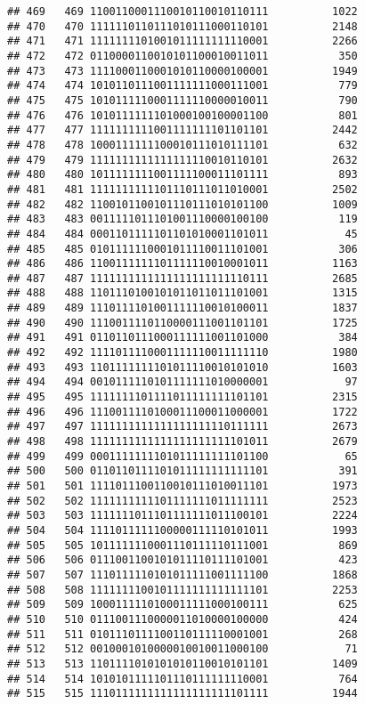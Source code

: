 \documentclass[]{article}
\begin{document}
\begin{verbatim}
## 469   469 1100110001110010110010110111          1022
## 470   470 1111110110111010111000110101          2148
## 471   471 1111111101001011111111110001          2266
## 472   472 0110000110010101100010011011           350
## 473   473 1111000110001010110000100001          1949
## 474   474 1010110111001111111000111001           779
## 475   475 1010111110001111110000010011           790
## 476   476 1010111111101000100100001100           801
## 477   477 1111111111001111111101101101          2442
## 478   478 1000111111100010111010111101           632
## 479   479 1111111111111111110010110101          2632
## 480   480 1011111111001111100011101111           893
## 481   481 1111111111101110111011010001          2502
## 482   482 1100101100101110111010101100          1009
## 483   483 0011111011101001110000100100           119
## 484   484 0001101111101101010001101011            45
## 485   485 0101111110001011110011101001           306
## 486   486 1100111111101111110010001011          1163
## 487   487 1111111111111111111111110111          2685
## 488   488 1101110100101011011011101001          1315
## 489   489 1110111101001111110010100011          1837
## 490   490 1110011110110000111001101101          1725
## 491   491 0110110111000111111001101000           384
## 492   492 1111011110001111110011111110          1980
## 493   493 1101111111101011110010101010          1603
## 494   494 0010111110101111111010000001            97
## 495   495 1111111101111011111111101101          2315
## 496   496 1110011110100011100011000001          1722
## 497   497 1111111111111111111110111111          2673
## 498   498 1111111111111111111111101011          2679
## 499   499 0001111111101011111111101100            65
## 500   500 0110110111101011111111111101           391
## 501   501 1111011100110010111010011101          1973
## 502   502 1111111111101111111011111111          2523
## 503   503 1111111011101111111011100101          2224
## 504   504 1111011111100000111110101011          1993
## 505   505 1011111110001110111110111001           869
## 506   506 0111001100101011110111101001           423
## 507   507 1110111110101011111001111100          1868
## 508   508 1111111100101111111111111101          2253
## 509   509 1000111110100011111000100111           625
## 510   510 0111001110000011010000100000           424
## 511   511 0101110111100110111110001001           268
## 512   512 0010001010000010010011000100            71
## 513   513 1101111010101010110010101101          1409
## 514   514 1010101111101110111111110001           764
## 515   515 1110111111111111111111101111          1944

\end{verbatim}
\end{document}
